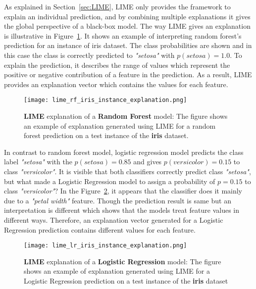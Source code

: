 \documentclass[english]{tktltiki2}
\theoremstyle{definition}
\theoremstyle{remark}
\begin{document}
As explained in Section~\ref{sec:LIME}, LIME only provides the framework to explain an individual prediction, and by combining multiple explanations it gives the global perspective of a black-box model. The way LIME gives an explanation is illustrative in Figure~\ref{fig:lime_rf_iris_instance_explanation}. It shows an example of interpreting random forest's prediction for an instance of iris dataset. The class probabilities are shown and in this case the class is correctly predicted to \textit{"setosa"} with $p(setosa)=1.0$. To explain the prediction, it describes the range of values which represent the positive or negative contribution of a feature in the prediction. As a result, LIME provides an explanation vector which contains the values for each feature.
\begin{figure}[H]
	\centering
	\vspace*{5mm}
	\texttt{[image: lime\_rf\_iris\_instance\_explanation.png]}
	\caption{\textbf{LIME} explanation of a \textbf{Random Forest} model: The figure shows an example of explanation generated using LIME for a random forest prediction on a test instance of the \textbf{iris} dataset.}
	\label{fig:lime_rf_iris_instance_explanation}
\end{figure}

In contrast to random forest model, logistic regression model predicts the class label \textit{"setosa"} with the $p(setosa) = 0.85$ and gives $p(versicolor) = 0.15$ to class \textit{"versicolor"}. It is visible that both classifiers correctly predict class \textit{"setosa"}, but what made a Logistic Regression model to assign a probability of $p=0.15$ to class \textit{"versicolor"}? In the Figure~\ref{fig:lime_lr_iris_instance_explanation}, it appears that the classifier does it mainly due to a \textit{"petal width"} feature. Though the prediction result is same but an interpretation is different which shows that the models treat feature values in different ways. Therefore, an explanation vector generated for a Logistic Regression prediction contains different values for each feature.
\begin{figure}[H]
	\centering
	\vspace*{5mm}
	\texttt{[image: lime\_lr\_iris\_instance\_explanation.png]}
	\caption{\textbf{LIME} explanation of a \textbf{Logistic Regression} model: The figure shows an example of explanation generated using LIME for a Logistic Regression prediction on a test instance of the \textbf{iris} dataset}
	\label{fig:lime_lr_iris_instance_explanation}
\end{figure} 
\end{document}
